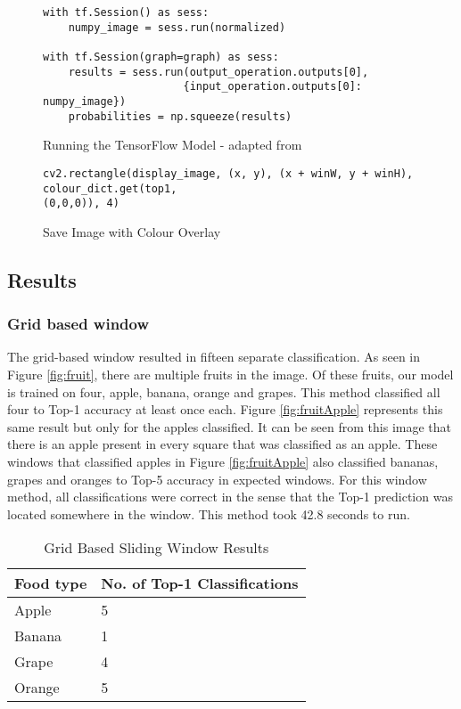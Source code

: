 \begin{figure}[h]
\caption{Running the TensorFlow Model - adapted from \parencite{retrainInception}}
\label{lst:runModel}
\begin{lstlisting}[style=Python]
with tf.Session() as sess:
	numpy_image = sess.run(normalized)

with tf.Session(graph=graph) as sess:
    results = sess.run(output_operation.outputs[0],
                      {input_operation.outputs[0]: numpy_image})
	probabilities = np.squeeze(results)
\end{lstlisting}
\end{figure}

\begin{figure}[h]
\caption{Save Image with Colour Overlay}
\label{lst:colourOverlay}
\begin{lstlisting}[style=Python]
cv2.rectangle(display_image, (x, y), (x + winW, y + winH), colour_dict.get(top1,
(0,0,0)), 4)
\end{lstlisting}
\end{figure}

\tocless\subsection{Results}
\tocless\subsubsection{Grid based window}
The grid-based window resulted in fifteen separate classification. As seen in Figure
\ref{fig:fruit}, there are multiple fruits in the image. Of these fruits, our
model is trained on four, apple, banana, orange and grapes. This method
classified all four to Top-1 accuracy at least once each.
Figure \ref{fig:fruitApple} represents this same result but only for the apples classified.
It can be seen from this image that there is an apple present in every square that was classified as an apple.
These windows that classified apples in Figure \ref{fig:fruitApple} also classified bananas, grapes and oranges to Top-5 accuracy in expected windows.
For this window method, all classifications were correct in the sense that the Top-1 prediction was located somewhere in the window.
This method took 42.8 seconds to run.


\begin{table}[h]
	\centering
	\caption{Grid Based Sliding Window Results}
	\label{my-label}
	\begin{tabular}{|l|l|}
	\hline
		\textbf{Food type} & \textbf{No. of Top-1 Classifications} \\ \hline
		Apple     & 5                      \\ \hline
		Banana    & 1                      \\ \hline
		Grape     & 4                      \\ \hline
		Orange    & 5                     \\ \hline
	\end{tabular}
\end{table}

